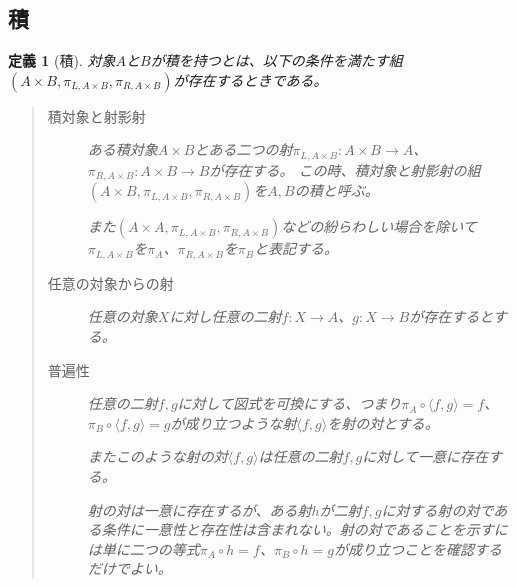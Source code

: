 \documentclass[uplatex,dvipdfmx]{jsarticle}
\newcommand{\arrow}{\rightarrow}
\newcommand{\tuple}[1]{\langle #1\rangle}
\newcommand{\mor}[3]{#1:#2\arrow #3}
\newtheorem{define}{定義}[section]
\numberwithin{proof}{subsection}
\numberwithin{prop}{subsection}
\numberwithin{define}{subsection}
\begin{document}
	\subsection{積}
	\begin{define}[積]
		対象$A$と$B$が積を持つとは、以下の条件を満たす組$(A\times B,\pi_{L,A\times B},\pi_{R,A\times B})$が存在するときである。
		\begin{quote}
			\begin{description}
			\item[積対象と射影射]ある積対象$A\times B$とある二つの射$\mor{\pi_{L,A\times B}}{A\times B}{A}$、$\mor{\pi_{R,A\times B}}{A\times B}{B}$が存在する。
			この時、積対象と射影射の組$(A\times B,\pi_{L,A\times B},\pi_{R,A\times B})$を$A,B$の積と呼ぶ。


			\begin{center}
			\end{center}
			また$(A\times A,\pi_{L,A\times B},\pi_{R,A\times B})$などの紛らわしい場合を除いて$\pi_{L,A\times B}$を$\pi_A$、$\pi_{R,A\times B}$を$\pi_B$と表記する。
			\item[任意の対象からの射]任意の対象$X$に対し任意の二射$\mor{f}{X}{A}$、$\mor{g}{X}{B}$が存在するとする。
			\begin{center}
			\end{center}
			\item[普遍性]任意の二射$f,g$に対して図式を可換にする、つまり$\pi_A\circ\tuple{f,g}=f$、$\pi_B\circ\tuple{f,g}=g$が成り立つような射$\tuple{f,g}$を射の対とする。

			またこのような射の対$\tuple{f,g}$は任意の二射$f,g$に対して一意に存在する。

			射の対は一意に存在するが、ある射$h$が二射$f,g$に対する射の対である条件に一意性と存在性は含まれない。射の対であることを示すには単に二つの等式$\pi_A\circ h=f$、$\pi_B\circ h=g$が成り立つことを確認するだけでよい。


\end{description}
\end{quote}
\end{define}
\end{document}
